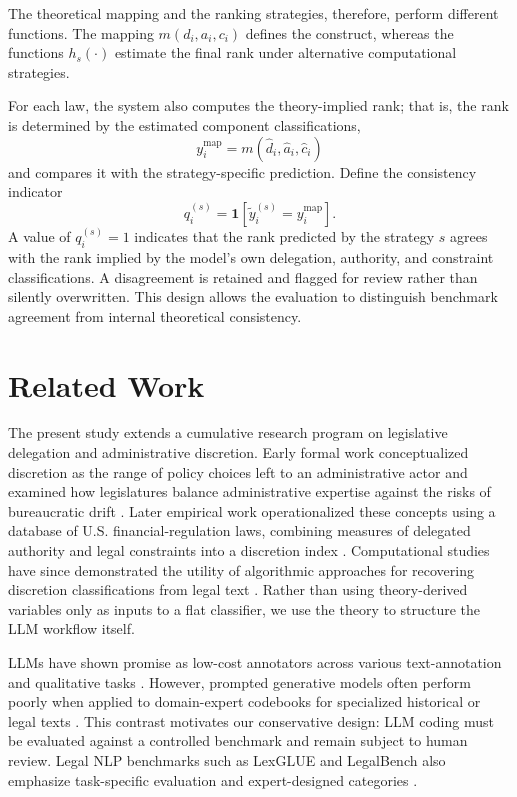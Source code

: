 \documentclass[conference]{IEEEtran}
\begin{document}
The theoretical mapping and the ranking strategies, therefore, perform different functions. The mapping $m(d_i,a_i,c_i)$ defines the construct, whereas the functions $h_s(\cdot)$ estimate the final rank under alternative computational strategies.

For each law, the system also computes the theory-implied rank; that is, the rank is determined by the estimated component classifications,
\[
y_i^{\mathrm{map}} = m(\hat d_i,\hat a_i,\hat c_i)
\]
and compares it with the strategy-specific prediction. Define the consistency indicator
\[
q_i^{(s)} = \mathbf{1}\left[\tilde y_i^{(s)} = y_i^{\mathrm{map}}\right].
\]
A value of $q_i^{(s)}=1$ indicates that the rank predicted by the strategy $s$ agrees with the rank implied by the model's own delegation, authority, and constraint classifications. A disagreement is retained and flagged for review rather than silently overwritten. This design allows the evaluation to distinguish benchmark agreement from internal theoretical consistency.


\section{Related Work}

The present study extends a cumulative research program on legislative delegation and administrative discretion. Early formal work conceptualized discretion as the range of policy choices left to an administrative actor and examined how legislatures balance administrative expertise against the risks of bureaucratic drift \citep{epstein1994administrative}. Later empirical work operationalized these concepts using a database of U.S. financial-regulation laws, combining measures of delegated authority and legal constraints into a discretion index \citep{ohalloran2015banking,ohalloran2016datascience,groll2021delegation}. Computational studies have since demonstrated the utility of algorithmic approaches for recovering discretion classifications from legal text \citep{ohalloran2015markets,ohalloran2016computational,ohalloran2017graph}. Rather than using theory-derived variables only as inputs to a flat classifier, we use the theory to structure the LLM workflow itself.

LLMs have shown promise as low-cost annotators across various text-annotation and qualitative tasks \citep{gilardi2023chatgpt,dai2023llm}. However, prompted generative models often perform poorly when applied to domain-expert codebooks for specialized historical or legal texts \citep{thalken2023modeling}. This contrast motivates our conservative design: LLM coding must be evaluated against a controlled benchmark and remain subject to human review. Legal NLP benchmarks such as LexGLUE and LegalBench also emphasize task-specific evaluation and expert-designed categories \citep{chalkidis2022lexglue,guha2023legalbench}.
\end{document}
